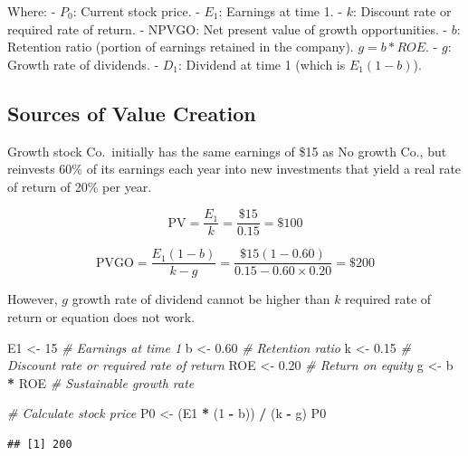 \documentclass[
]{book}
\newenvironment{Shaded}{\begin{snugshade}}{\end{snugshade}}
\newcommand{\CommentTok}[1]{\textcolor[rgb]{0.56,0.35,0.01}{\textit{#1}}}
\newcommand{\DecValTok}[1]{\textcolor[rgb]{0.00,0.00,0.81}{#1}}
\newcommand{\FloatTok}[1]{\textcolor[rgb]{0.00,0.00,0.81}{#1}}
\newcommand{\NormalTok}[1]{#1}
\newcommand{\OtherTok}[1]{\textcolor[rgb]{0.56,0.35,0.01}{#1}}
\newcommand{\SpecialCharTok}[1]{\textcolor[rgb]{0.81,0.36,0.00}{\textbf{#1}}}
\begin{document}
Where:
- \(P_0\): Current stock price.
- \(E_1\): Earnings at time 1.
- \(k\): Discount rate or required rate of return.
- \(\text{NPVGO}\): Net present value of growth opportunities.
- \(b\): Retention ratio (portion of earnings retained in the company). \(g = b*ROE\).
- \(g\): Growth rate of dividends.
- \(D_1\): Dividend at time 1 (which is \(E_1 (1 - b)\)).

\hypertarget{sources-of-value-creation}{%
\subsection{Sources of Value Creation}\label{sources-of-value-creation}}

Growth stock Co.~initially has the same earnings of \$15 as No growth Co., but reinvests 60\% of its earnings each year into new investments that yield a real rate of return of 20\% per year.

\[
  \text{PV} = \frac{E_1}{k} = \frac{\$15}{0.15} = \$100
  \]

\[
  \text{PVGO} = \frac{E_1 (1 - b)}{k - g} = \frac{\$15 (1 - 0.60)}{0.15 - 0.60 \times 0.20} = \$200
  \]

However, \(g\) growth rate of dividend cannot be higher than \(k\) required rate of return or equation does not work.

\begin{Shaded}
\begin{Highlighting}[]
\NormalTok{E1 }\OtherTok{\textless{}{-}} \DecValTok{15}              \CommentTok{\# Earnings at time 1}
\NormalTok{b }\OtherTok{\textless{}{-}} \FloatTok{0.60}             \CommentTok{\# Retention ratio}
\NormalTok{k }\OtherTok{\textless{}{-}} \FloatTok{0.15}             \CommentTok{\# Discount rate or required rate of return}
\NormalTok{ROE }\OtherTok{\textless{}{-}} \FloatTok{0.20}           \CommentTok{\# Return on equity}
\NormalTok{g }\OtherTok{\textless{}{-}}\NormalTok{ b }\SpecialCharTok{*}\NormalTok{ ROE          }\CommentTok{\# Sustainable growth rate}

\CommentTok{\# Calculate stock price}
\NormalTok{P0 }\OtherTok{\textless{}{-}}\NormalTok{ (E1 }\SpecialCharTok{*}\NormalTok{ (}\DecValTok{1} \SpecialCharTok{{-}}\NormalTok{ b)) }\SpecialCharTok{/}\NormalTok{ (k }\SpecialCharTok{{-}}\NormalTok{ g)}
\NormalTok{P0}
\end{Highlighting}
\end{Shaded}

\begin{verbatim}
## [1] 200
\end{verbatim}
\end{document}
